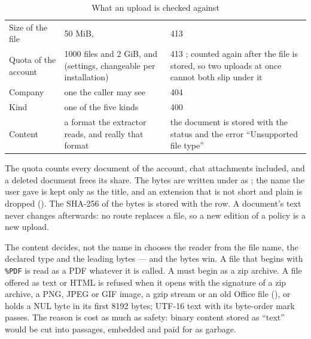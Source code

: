 \begin{table}[H]
\caption{What an upload is checked against}\label{tab:company:limits}
\begin{tabularx}{\textwidth}{@{}L{31mm}L{50mm}Y@{}}
\toprule
{} &  &  \\
\midrule
Size of the file & 50 MiB,  & 413  \\
Quota of the account & 1000 files and 2 GiB,  and
   (settings, changeable per installation) & 413
  ; counted again after the file is stored, so two uploads at once cannot
  both slip under it \\
Company & one the caller may see & 404  \\
Kind & one of the five kinds & 400  \\
Content & a format the extractor reads, and really that format & the document is stored with
  the status  and the error \enquote{Unsupported file type} \\
\bottomrule
\end{tabularx}
\end{table}

The quota counts every document of the account, chat attachments included, and a deleted
document frees its share. The bytes are written under  as
; the name the user gave is kept only as the title, and an extension
that is not short and plain is dropped (). The SHA-256 of the bytes is
stored with the row. A document's text never changes afterwards: no route replaces a file, so
a new edition of a policy is a new upload.

\begin{codebox}{The content decides, not the name}
 in  chooses the reader from the file name, the
declared type and the leading bytes --- and the bytes win. A file that begins with
\texttt{\%PDF} is read as a PDF whatever it is called. A  must begin as a zip
archive. A file offered as text or HTML is refused when it opens with the signature of a zip
archive, a PNG, JPEG or GIF image, a gzip stream or an old Office file (),
or holds a NUL byte in its first 8192 bytes; UTF-16 text with its byte-order mark passes. The
reason is cost as much as safety: binary content stored as \enquote{text} would be cut into
passages, embedded and paid for as garbage.
\end{codebox}

